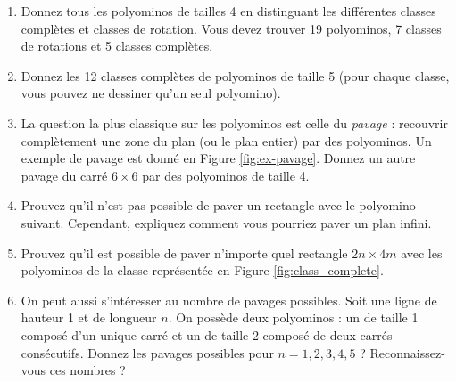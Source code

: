 \documentclass{../ficheTDTP}
\begin{document}
\begin{enumerate}
\item Donnez tous les polyominos de tailles 4 en distinguant les différentes classes complètes et classes de rotation. Vous devez trouver 19 polyominos, 7 classes de rotations et 5 classes complètes.

\item Donnez les 12 classes complètes de polyominos de taille 5 (pour chaque classe, vous pouvez ne dessiner qu'un seul polyomino). 

\item La question la plus classique sur les polyominos est celle du \emph{pavage} : recouvrir complètement une zone du plan (ou le plan entier) par des polyominos. Un exemple de pavage est donné en Figure \ref{fig:ex-pavage}. Donnez un autre pavage du carré $6 \times 6$ par des polyominos de taille 4.

\item Prouvez qu'il n'est pas possible de paver un rectangle avec le polyomino suivant. Cependant, expliquez comment vous pourriez paver un plan infini.


\item Prouvez qu'il est possible de paver n'importe quel rectangle $2n \times 4m$ avec les polyominos de la classe représentée en Figure \ref{fig:class_complete}. 

\item On peut aussi s'intéresser au nombre de pavages possibles. Soit une ligne de hauteur 1 et de longueur $n$. On possède deux polyominos : un de taille 1 composé d'un unique carré et un de taille 2 composé de deux carrés consécutifs. Donnez les pavages possibles pour $n = 1, 2, 3, 4, 5$ ? Reconnaissez-vous ces nombres ?
\end{enumerate}
\end{document}

